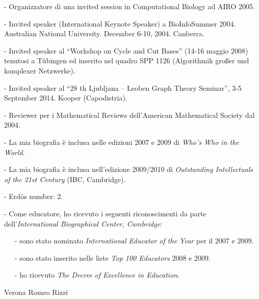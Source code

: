 \documentclass[10pt]{article}
\newcommand{\voice}[1] { \bigskip \medskip \noindent {\Large \bf #1} \medskip\\ }
\begin{document}
   - Organizzatore di una invited session in Computational Biology ad AIRO 2005.

   - Invited speaker (International Keynote Speaker) a BioInfoSummer 2004.
Australian National University. December 6-10, 2004. Canberra.

   - Invited speaker al
     ``Workshop on Cycle and Cut Bases'' (14-16 maggio 2008)
     tenutosi a T\"ubingen ed inserito nel quadro
     SPP 1126 (Algorithmik großer und komplexer Netzwerke).

   - Invited speaker al
   ``28 th Ljubljana – Leoben Graph Theory Seminar'',
   3-5 September 2014. Kooper (Capodistria). 

   - Reviewer per i Mathematical Reviews dell'American Mathematical Society
     dal 2004.

   - La mia biografia \`e inclusa nelle edizioni 2007 e 2009
     di \emph{Who's Who in the World}.

   - La mia biografia \`e inclusa nell'edizione 2009/2010
     di \emph{Outstanding Intellectuals of the 21st Century} (IBC, Cambridge).

   - Erd\"os number: 2.

   - Come educatore, ho ricevuto i seguenti riconoscimenti
     da parte dell'\emph{International Biographical Center, Cambridge}:

   \ \ \ - sono stato nominato \emph{International Educator of the Year} per il 2007 e 2009.

   \ \ \ - sono stato inserito nelle liste \emph{Top 100 Educators} 2008
           e 2009.

   \ \ \ - ho ricevuto \emph{The Decree of Excellence in Education}.

   


%
%




\vspace{1.2cm}
Verona \hspace{7.8cm} Romeo Rizzi
\end{document}
